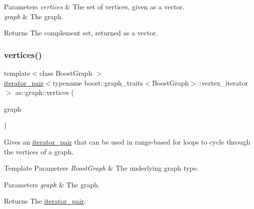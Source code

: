 \begin{DoxyParams}{Parameters}
{\em vertices} & The set of vertices, given as a vector. \\
\hline
{\em graph} & The graph. \\
\hline
\end{DoxyParams}
\begin{DoxyReturn}{Returns}
The complement set, returned as a vector. 
\end{DoxyReturn}
\mbox{\label{namespaceas_1_1graph_ab93ee208eb116d3a3349c8de8cc91445}} 
\subsubsection{\texorpdfstring{vertices()}{vertices()}}
{\footnotesize\ttfamily template$<$class Boost\+Graph $>$ \\
\hyperlink{classas_1_1iterator__pair}{iterator\+\_\+pair}$<$typename boost\+::graph\+\_\+traits$<$Boost\+Graph$>$\+::vertex\+\_\+iterator$>$ as\+::graph\+::vertices (\begin{DoxyParamCaption}\item[{const Boost\+Graph \&}]{graph }\end{DoxyParamCaption})\hspace{0.3cm}{\ttfamily [inline]}}



Gives an \hyperlink{classas_1_1iterator__pair}{iterator\+\_\+pair} that can be used in range-\/based for loops to cycle through the vertices of a graph. 


\begin{DoxyTemplParams}{Template Parameters}
{\em Boost\+Graph} & The underlying graph type. \\
\hline
\end{DoxyTemplParams}

\begin{DoxyParams}{Parameters}
{\em graph} & The graph. \\
\hline
\end{DoxyParams}
\begin{DoxyReturn}{Returns}
The \hyperlink{classas_1_1iterator__pair}{iterator\+\_\+pair}. 
\end{DoxyReturn}
